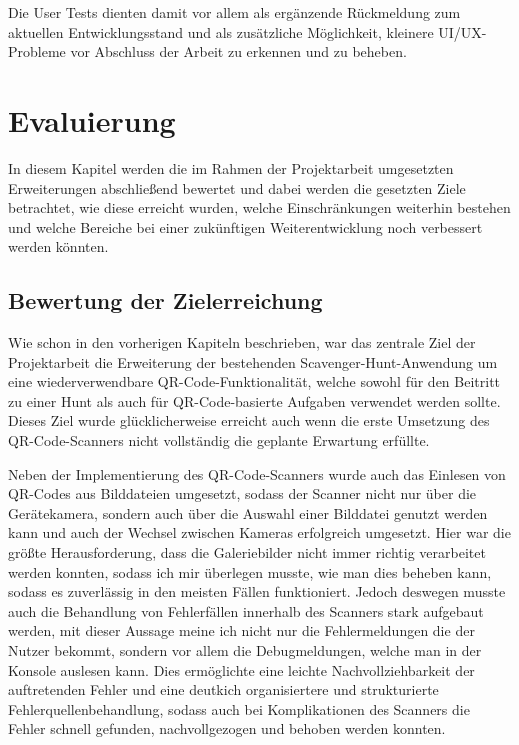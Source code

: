 ﻿\documentclass[oneside]{ausarbeitung}
\begin{document}
Die User Tests dienten damit vor allem als ergänzende Rückmeldung zum aktuellen Entwicklungsstand und als zusätzliche Möglichkeit, kleinere
UI/UX-Probleme vor Abschluss der Arbeit zu erkennen und zu beheben.



\chapter{Evaluierung}
\label{cha:evaluierung}

In diesem Kapitel werden die im Rahmen der Projektarbeit umgesetzten Erweiterungen abschließend bewertet und dabei werden die gesetzten Ziele
betrachtet, wie diese erreicht wurden, welche Einschränkungen weiterhin bestehen und welche Bereiche bei einer zukünftigen Weiterentwicklung noch
verbessert werden könnten.


\section{Bewertung der Zielerreichung}
\label{sec:bewertung-zielerreichung}

Wie schon in den vorherigen Kapiteln beschrieben, war das zentrale Ziel der Projektarbeit die Erweiterung der bestehenden Scavenger-Hunt-Anwendung
um eine wiederverwendbare QR-Code-Funktionalität, welche sowohl für den Beitritt zu einer Hunt als auch für QR-Code-basierte Aufgaben verwendet werden
sollte. Dieses Ziel wurde glücklicherweise erreicht auch wenn die erste Umsetzung des QR-Code-Scanners nicht vollständig die geplante Erwartung erfüllte.

Neben der Implementierung des QR-Code-Scanners wurde auch das Einlesen von QR-Codes aus Bilddateien umgesetzt, sodass der Scanner nicht nur über die
Gerätekamera, sondern auch über die Auswahl einer Bilddatei genutzt werden kann und auch der Wechsel zwischen Kameras erfolgreich umgesetzt. Hier
war die größte Herausforderung, dass die Galeriebilder nicht immer richtig verarbeitet werden konnten, sodass ich mir überlegen musste, wie man dies
beheben kann, sodass es zuverlässig in den meisten Fällen funktioniert. Jedoch deswegen musste auch die Behandlung von Fehlerfällen innerhalb des
Scanners stark aufgebaut werden, mit dieser Aussage meine ich nicht nur die Fehlermeldungen die der Nutzer bekommt, sondern vor allem die Debugmeldungen,
welche man in der Konsole auslesen kann. Dies ermöglichte eine leichte Nachvollziehbarkeit der auftretenden Fehler und eine deutkich organisiertere
und strukturierte Fehlerquellenbehandlung, sodass auch bei Komplikationen des Scanners die Fehler schnell gefunden, nachvollgezogen und behoben werden 
konnten.
\end{document}
